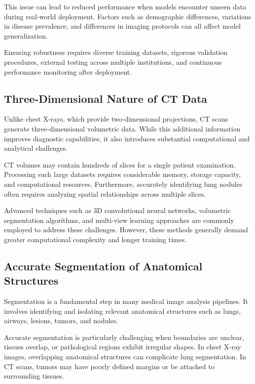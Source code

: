 This issue can lead to reduced performance when models encounter unseen data during real-world deployment. Factors such as demographic differences, variations in disease prevalence, and differences in imaging protocols can all affect model generalization.

Ensuring robustness requires diverse training datasets, rigorous validation procedures, external testing across multiple institutions, and continuous performance monitoring after deployment.

\subsection{Three-Dimensional Nature of CT Data}

Unlike chest X-rays, which provide two-dimensional projections, CT scans generate three-dimensional volumetric data. While this additional information improves diagnostic capabilities, it also introduces substantial computational and analytical challenges.

CT volumes may contain hundreds of slices for a single patient examination. Processing such large datasets requires considerable memory, storage capacity, and computational resources. Furthermore, accurately identifying lung nodules often requires analyzing spatial relationships across multiple slices.

Advanced techniques such as 3D convolutional neural networks, volumetric segmentation algorithms, and multi-view learning approaches are commonly employed to address these challenges. However, these methods generally demand greater computational complexity and longer training times.

\subsection{Accurate Segmentation of Anatomical Structures}

Segmentation is a fundamental step in many medical image analysis pipelines. It involves identifying and isolating relevant anatomical structures such as lungs, airways, lesions, tumors, and nodules.

Accurate segmentation is particularly challenging when boundaries are unclear, tissues overlap, or pathological regions exhibit irregular shapes. In chest X-ray images, overlapping anatomical structures can complicate lung segmentation. In CT scans, tumors may have poorly defined margins or be attached to surrounding tissues.

